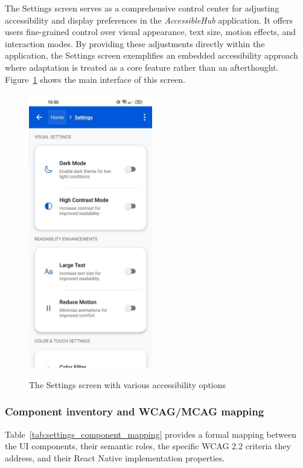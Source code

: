 The Settings screen serves as a comprehensive control center for adjusting accessibility and display preferences in the \textit{AccessibleHub} application. It offers users fine-grained control over visual appearance, text size, motion effects, and interaction modes. By providing these adjustments directly within the application, the Settings screen exemplifies an embedded accessibility approach where adaptation is treated as a core feature rather than an afterthought. Figure~\ref{fig:settings_screen_main} shows the main interface of this screen.

\begin{figure}[ht]
    \centering
    \includegraphics[width=0.48\textwidth, alt={Settings screen showing accessibility options}]{img/settings_normal.jpg}
    \caption{The Settings screen with various accessibility options}
    \label{fig:settings_screen_main}
\end{figure}

\subsubsection{Component inventory and WCAG/MCAG mapping}

Table~\ref{tab:settings_component_mapping} provides a formal mapping between the UI components, their semantic roles, the specific WCAG 2.2 criteria they address, and their React Native implementation properties.

